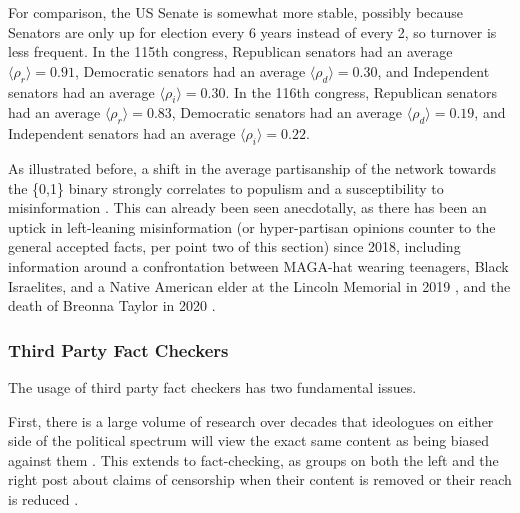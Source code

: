 \documentclass[12pt]{article}
\begin{document}
 For comparison, the US Senate is somewhat more stable, possibly because Senators are only up for election every 6 years instead of every 2, so turnover is less frequent. In the 115th congress, Republican senators had an average $\langle \rho_r \rangle = 0.91$, Democratic senators had an average $\langle \rho_d \rangle = 0.30$, and Independent senators had an average $\langle \rho_i \rangle = 0.30$. In the 116th congress, Republican senators had an average $\langle \rho_r \rangle = 0.83$, Democratic senators had an average $\langle \rho_d \rangle = 0.19$, and Independent senators had an average $\langle \rho_i \rangle = 0.22$.
 
 As illustrated before, a shift in the average partisanship of the network towards the \{0,1\} binary strongly correlates to populism and a susceptibility to misinformation \cite{hopp2020people,kahan2012ideology,mourao2019fake,shin2017partisan,swire2017processing,vargo2018agenda}. This can already been seen anecdotally, as there has been an uptick in left-leaning misinformation (or hyper-partisan opinions counter to the general accepted facts, per point two of this section)  since 2018, including information around a confrontation between MAGA-hat wearing teenagers, Black Israelites, and a Native American elder at the Lincoln Memorial in 2019 \cite{sacks2019maga,healy2019believing,pond2020complexity}, and the death of Breonna Taylor in 2020 \cite{duvall2020fact,kim2020fact}. 

 \subsubsection{Third Party Fact Checkers}
 The usage of third party fact checkers has two fundamental issues.
 
 First, there is a large volume of research over decades that ideologues on either side of the political spectrum will view the exact same content as being biased against them \cite{arpan2003experimental,baum2008eye,christen2002hostile,gunther2001predicting,gunther2004mapping,baum2004issue,gussin2004eye,lee2005liberal,vallone1985hostile}. This extends to fact-checking, as groups on both the left and the right post about claims of censorship when their content is removed or their reach is reduced \cite{Dreyfuss2020Now,Post2020Facebook,Millhiser2018Facebook}. 
 
\end{document}
